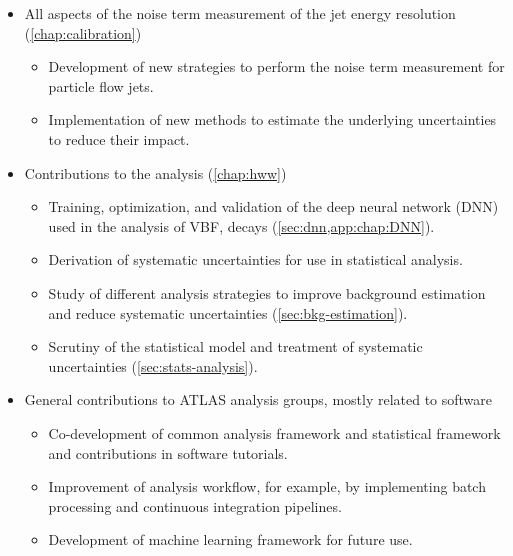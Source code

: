 \begin{itemize}
    \item All aspects of the noise term measurement of the jet energy resolution (\cref{chap:calibration})
          \begin{itemize}
              \item Development of new strategies to perform the noise term measurement for particle flow jets.
              \item Implementation of new methods to estimate the underlying uncertainties to reduce their impact.
          \end{itemize}
    \item Contributions to the \HWW analysis (\cref{chap:hww})
          \begin{itemize}
              \item Training, optimization, and validation of the deep neural network (DNN) used in the analysis of VBF, \HWW decays (\cref{sec:dnn,app:chap:DNN}).
              \item Derivation of systematic uncertainties for use in statistical analysis.
              \item Study of different analysis strategies to improve background estimation and reduce systematic uncertainties (\cref{sec:bkg-estimation}).
              \item Scrutiny of the statistical model and treatment of systematic uncertainties (\cref{sec:stats-analysis}).
          \end{itemize}
    \item General contributions to ATLAS analysis groups, mostly related to software
          \begin{itemize}
              \item Co-development of common analysis framework and statistical framework and contributions in software tutorials.
              \item Improvement of analysis workflow, for example, by implementing batch processing and continuous integration pipelines.
              \item Development of machine learning framework for future use.
          \end{itemize}
\end{itemize}
